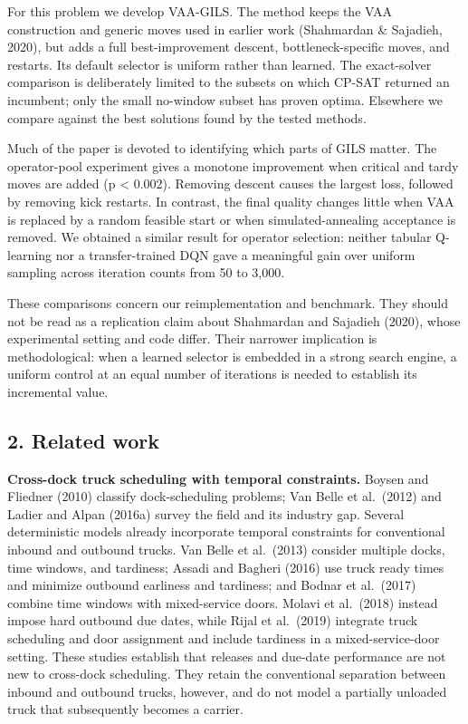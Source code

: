 \documentclass[
]{article}
\begin{document}
For this problem we develop VAA-GILS. The method keeps the VAA
construction and generic moves used in earlier work (Shahmardan \&
Sajadieh, 2020), but adds a full best-improvement descent,
bottleneck-specific moves, and restarts. Its default selector is uniform
rather than learned. The exact-solver comparison is deliberately limited
to the subsets on which CP-SAT returned an incumbent; only the small
no-window subset has proven optima. Elsewhere we compare against the
best solutions found by the tested methods.

Much of the paper is devoted to identifying which parts of GILS matter.
The operator-pool experiment gives a monotone improvement when critical
and tardy moves are added (p \textless{} 0.002). Removing descent causes
the largest loss, followed by removing kick restarts. In contrast, the
final quality changes little when VAA is replaced by a random feasible
start or when simulated-annealing acceptance is removed. We obtained a
similar result for operator selection: neither tabular Q-learning nor a
transfer-trained DQN gave a meaningful gain over uniform sampling across iteration counts from 50 to 3,000.

These comparisons concern our reimplementation and benchmark. They
should not be read as a replication claim about Shahmardan and Sajadieh
(2020), whose experimental setting and code differ. Their narrower
implication is methodological: when a learned selector is embedded in a
strong search engine, a uniform control at an equal number of iterations is needed to
establish its incremental value.

\subsection{2. Related work}\label{related-work}

\textbf{Cross-dock truck scheduling with temporal constraints.} Boysen
and Fliedner (2010) classify dock-scheduling problems; Van Belle et
al.~(2012) and Ladier and Alpan (2016a) survey the field and its
industry gap. Several deterministic models already incorporate temporal
constraints for conventional inbound and outbound trucks. Van Belle et
al.~(2013) consider multiple docks, time windows, and tardiness; Assadi
and Bagheri (2016) use truck ready times and minimize outbound earliness
and tardiness; and Bodnar et al.~(2017) combine time windows with
mixed-service doors. Molavi et al.~(2018) instead impose hard outbound
due dates, while Rijal et al.~(2019) integrate truck scheduling and door
assignment and include tardiness in a mixed-service-door setting. These
studies establish that releases and due-date performance are not new to
cross-dock scheduling. They retain the conventional separation between
inbound and outbound trucks, however, and do not model a partially
unloaded truck that subsequently becomes a carrier.
\end{document}
